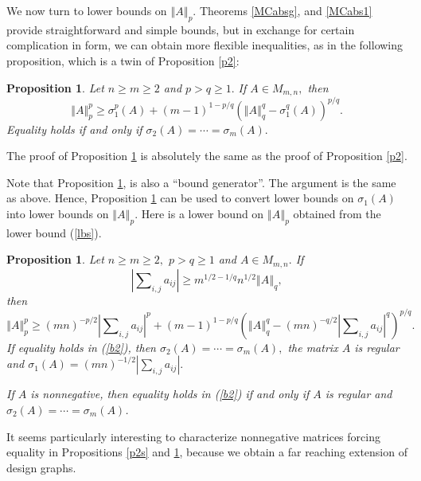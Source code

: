 \documentclass[12pt]{article}%
\newtheorem{proposition}[theorem]{Proposition}
\begin{document}
We now turn to lower bounds on $\left\Vert A\right\Vert _{p}.$ Theorems
\ref{MCabsg}, and \ref{MCabs1} provide straightforward and simple bounds, but
in exchange for certain complication in form, we can obtain more flexible
inequalities, as in the following proposition, which is a twin of Proposition
\ref{p2}:

\begin{proposition}
\label{p3}Let $n\geq m\geq2$ and $p>q\geq1.$ If $A\in M_{m,n},$ then
\[
\left\Vert A\right\Vert _{p}^{p}\geq\sigma_{1}^{p}\left(  A\right)  +\left(
m-1\right)  ^{1-p/q}\left(  \left\Vert A\right\Vert _{q}^{q}-\sigma_{1}%
^{q}\left(  A\right)  \right)  ^{p/q}.
\]
Equality holds if and only if $\sigma_{2}\left(  A\right)  =\cdots=\sigma
_{m}\left(  A\right)  .$
\end{proposition}

The proof of Proposition \ref{p3} is absolutely the same as the proof of
Proposition \ref{p2}.

Note that Proposition \ref{p3}, is also a \textquotedblleft bound
generator\textquotedblright. The argument is the same as above. Hence,
Proposition \ref{p3} can be used to convert lower bounds on $\sigma_{1}\left(
A\right)  $ into lower bounds on $\left\Vert A\right\Vert _{p}.$ Here is a
lower bound on $\left\Vert A\right\Vert _{p}$ obtained from the lower bound
(\ref{lbs}).

\begin{proposition}
\label{p3s}Let $n\geq m\geq2,$ $p>q\geq1$ and $A\in M_{m,n}.$ If
\[
\left\vert \sum\nolimits_{i,j}a_{ij}\right\vert \geq m^{1/2-1/q}%
n^{1/2}\left\Vert A\right\Vert _{q},
\]
then
\[
\left\Vert A\right\Vert _{p}^{p}\geq\left(  mn\right)  ^{-p/2}\left\vert
\sum\nolimits_{i,j}a_{ij}\right\vert ^{p}+\left(  m-1\right)  ^{1-p/q}\left(
\left\Vert A\right\Vert _{q}^{q}-\left(  mn\right)  ^{-q/2}\left\vert
\sum\nolimits_{i,j}a_{ij}\right\vert ^{q}\right)  ^{p/q}.
\]
If equality holds in (\ref{b2}), then $\sigma_{2}\left(  A\right)
=\cdots=\sigma_{m}\left(  A\right)  ,$ the matrix $A$ is regular and
$\sigma_{1}\left(  A\right)  =\left(  mn\right)  ^{-1/2}\left\vert
\sum\nolimits_{i,j}a_{ij}\right\vert .$

If $A$ is nonnegative, then equality holds in (\ref{b2}) if and only if $A$ is
regular and $\sigma_{2}\left(  A\right)  =\cdots=\sigma_{m}\left(  A\right)  $.
\end{proposition}

It seems particularly interesting to characterize nonnegative matrices forcing
equality in Propositions \ref{p2s} and \ref{p3s}, because we obtain a far
reaching extension of design graphs.
\end{document}
